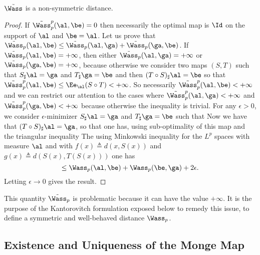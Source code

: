 \begin{prop}
	$\tilde \Wass$ is a non-symmetric distance.
\end{prop}
\begin{proof}
	If $\tilde \Wass_p^p(\al,\be)=0$ then necessarily the optimal map is $\Id$ on the support of $\al$ and $\be=\al$.
	Let us prove that $\tilde \Wass_p(\al,\be) \leq \tilde \Wass_p(\al,\ga)+\tilde \Wass_p(\ga,\be)$.
	If $\tilde \Wass_p(\al,\be)=+\infty$, then either $\tilde \Wass_p(\al,\ga)=+\infty$ or $\tilde \Wass_p(\ga,\be)=+\infty$, because otherwise we consider two maps $(S,T)$ such that $S_\sharp \al=\ga$ and $T_\sharp \ga=\be$ and then $(T \circ S)_\sharp \al = \be$ so that 
	$\tilde \Wass_p^p(\al,\be) \leq \Ee_\al(S \circ T) < +\infty$.
	So necessarily $\tilde \Wass_p^p(\al,\be)<+\infty$ and we can restrict our attention to the cases 
	where $\tilde \Wass_p^p(\al,\ga)<+\infty$ and $\tilde \Wass_p^p(\ga,\be)<+\infty$ because otherwise the inequality is trivial.
	For any $\epsilon>0$, we consider $\epsilon$-minimizer $S_\sharp \al=\ga$ and $T_\sharp \ga=\be$ such that
	Now we have that $(T \circ S)_\sharp \al=\ga$, so that 
	one has, using sub-optimality of this map and the triangular inequality 
	The using Minkowski inequality for the $L^p$ spaces with measure $\al$ 
	and with $f(x) \triangleq d(x,S(x))$ and $g(x) \triangleq d(S(x),T(S(x)))$
	one has
	$$
		\leq \Wass_p(\al,\be) + \Wass_p(\be,\ga) + 2 \epsilon.
	$$
	Letting $\epsilon \rightarrow 0$ gives the result. 
\end{proof}

This quantity $\tilde\Wass_p$ is problematic because it can have the value $+\infty$. It is the purpose of the Kantorovitch formulation exposed below to remedy this issue, to define a symmetric and well-behaved distance $\Wass_p$.

\subsection{Existence and Uniqueness of the Monge Map}

